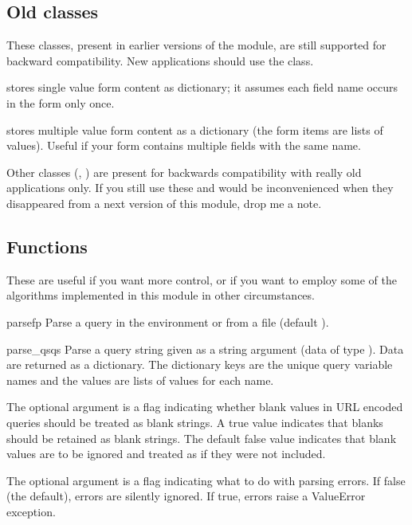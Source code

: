 \subsection{Old classes}

These classes, present in earlier versions of the  module,
are still supported for backward compatibility.  New applications
should use the  class.

 stores single value form content as
dictionary; it assumes each field name occurs in the form only once.

 stores multiple value form content as a
dictionary (the form items are lists of values).  Useful if your form
contains multiple fields with the same name.

Other classes (, ) are
present for backwards compatibility with really old applications only.
If you still use these and would be inconvenienced when they
disappeared from a next version of this module, drop me a note.


\subsection{Functions}

These are useful if you want more control, or if you want to employ
some of the algorithms implemented in this module in other
circumstances.

\begin{funcdesc}{parse}{fp}
Parse a query in the environment or from a file (default
).
\end{funcdesc}

\begin{funcdesc}{parse_qs}{qs}
Parse a query string given as a string argument (data of type 
).  Data are
returned as a dictionary.  The dictionary keys are the unique query
variable names and the values are lists of values for each name.

The optional argument  is
a flag indicating whether blank values in
URL encoded queries should be treated as blank strings.  
A true value indicates that blanks should be retained as 
blank strings.  The default false value indicates that
blank values are to be ignored and treated as if they were
not included.

The optional argument  is a flag indicating what
to do with parsing errors.  If false (the default), errors
are silently ignored.  If true, errors raise a ValueError
exception.
\end{funcdesc}

